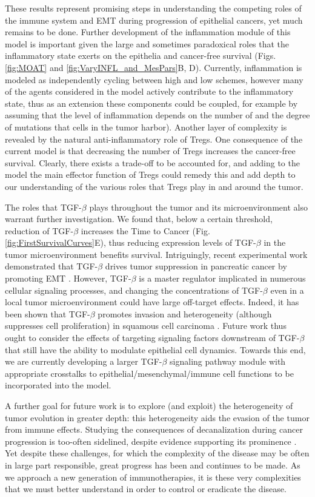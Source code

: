 \documentclass[11pt]{article}
\begin{document}
These results represent promising steps in understanding the competing roles of the immune system and EMT during progression of epithelial cancers, yet much remains to be done. Further development of the inflammation module of this model is important given the large and sometimes paradoxical roles that the inflammatory state exerts on the epithelia and cancer-free survival (Figs. \ref{fig:MOAT} and \ref{fig:VaryINFL_and_MesPars}B, D). Currently, inflammation is modeled as independently cycling between high and low schemes, however many of the agents considered in the model actively contribute to the inflammatory state, thus as an extension these components could be coupled, for example by assuming that the level of inflammation depends on the number of and the degree of mutations that cells in the tumor harbor).
Another layer of complexity is revealed by the natural anti-inflammatory role of Tregs. One consequence of the current model is that decreasing the number of Tregs increases the cancer-free survival. Clearly, there exists a trade-off to be accounted for, and adding to the model the main effector function of Tregs could remedy this and add depth to our understanding of the various roles that Tregs play in and around the tumor.
\par
The roles that TGF-$\beta$ plays throughout the tumor and its microenvironment also warrant further investigation. We found that, below a certain threshold, reduction of TGF-$\beta$ increases the Time to Cancer  (Fig. \ref{fig:FirstSurvivalCurves}E), thus reducing expression levels of TGF-$\beta$ in the tumor microenvironment benefits survival. Intriguingly, recent experimental work demonstrated that TGF-$\beta$ drives tumor suppression in pancreatic cancer by promoting EMT \cite{david16_tgfv}. However, TGF-$\beta$ is a master regulator implicated in numerous cellular signaling processes, and changing the concentrations of TGF-$\beta$ even in a local tumor microenvironment could have large off-target effects. Indeed, it has been shown that TGF-$\beta$ promotes invasion and heterogeneity (although suppresses cell proliferation) in squamous cell carcinoma \cite{oshimori15_tgfv}. Future work thus ought to consider the effects of targeting signaling factors downstream of TGF-$\beta$ that still have the ability to modulate epithelial cell dynamics. Towards this end, we are currently developing a larger TGF-$\beta$ signaling pathway module with appropriate crosstalks to  epithelial/mesenchymal/immune cell functions to be incorporated into the model.
\par
A further goal for future work is to explore (and exploit) the heterogeneity of tumor evolution in greater depth: this heterogeneity aids the evasion of the tumor from immune effects. Studying the consequences of decanalization \cite{gibson09_decanalization} during cancer progression is too-often sidelined, despite evidence supporting its prominence \cite{cyll17_tumour, punt17_tumour, dagogo-jack18_tumour}. Yet despite these challenges, for which the complexity of the disease may be often in large part responsible, great progress has been and continues to be made. As we approach a new generation of immunotherapies, it is these very complexities that we must better understand in order to control or eradicate the disease.
\end{document}
